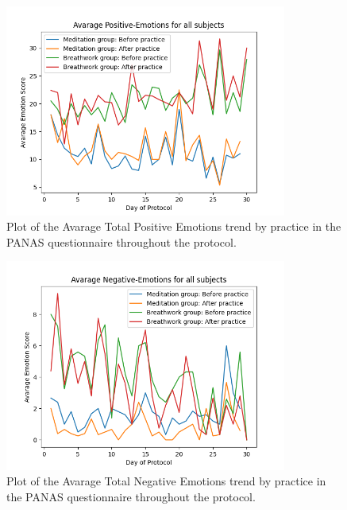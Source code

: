 \begin{figure}
    \centering
    \includegraphics[width=350px]{Figures/panas/avarages/Positive-Emotions.png}
    \caption{Plot of the Avarage Total Positive Emotions trend by practice in the PANAS questionnaire throughout the protocol.}
    \label{fig:positive_by_practice}
\end{figure} %
\begin{figure}
    \centering
    \includegraphics[width=350px]{Figures/panas/avarages/Negative-Emotions.png}
    \caption{Plot of the Avarage Total Negative Emotions trend by practice in the PANAS questionnaire throughout the protocol.}
    \label{fig:negative_by_practice}
\end{figure} %



